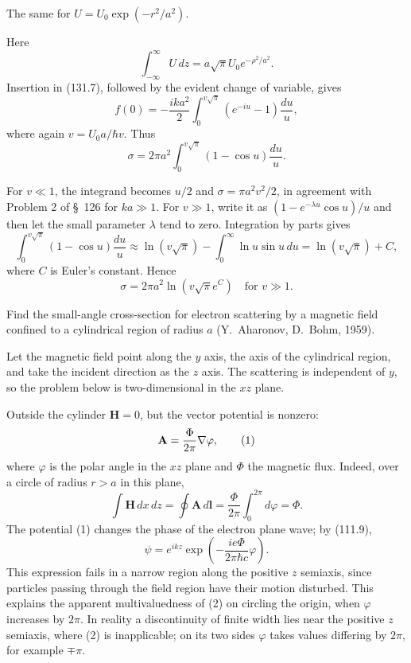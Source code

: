  The same for $U=U_0\exp(-r^2/a^2)$.

\SolutionHeading Here
\[
 \int_{-\infty}^{\infty}U\,dz=a\sqrt\pi U_0e^{-\rho^2/a^2}.
\]
Insertion in (131.7), followed by the evident change of variable, gives
\[
 f(0)=-\frac{ika^2}{2}\int_0^{v\sqrt\pi}(e^{-iu}-1)\frac{du}{u},
\]
where again $v=U_0a/\hbar v$. Thus
\[
 \sigma=2\pi a^2\int_0^{v\sqrt\pi}(1-\cos u)\frac{du}{u}.
\]

For $v\ll1$, the integrand becomes $u/2$ and
$\sigma=\pi a^2v^2/2$, in agreement with Problem 2 of \S~126 for $ka\gg1$.
For $v\gg1$, write it as $(1-e^{-\lambda u}\cos u)/u$ and then let the small
parameter $\lambda$ tend to zero. Integration by parts gives
\[
 \int_0^{v\sqrt\pi}(1-\cos u)\frac{du}{u}
 \approx\ln(v\sqrt\pi)-\int_0^\infty\ln u\sin u\,du
 =\ln(v\sqrt\pi)+C,
\]
where $C$ is Euler's constant. Hence
\[
 \sigma=2\pi a^2\ln(v\sqrt\pi e^C)\quad\text{for }v\gg1.
\]

 Find the small-angle cross-section for electron scattering
by a magnetic field confined to a cylindrical region of radius $a$
(Y.~Aharonov, D.~Bohm, 1959).

\SolutionHeading Let the magnetic field point along the $y$ axis, the axis of
the cylindrical region, and take the incident direction as the $z$ axis. The
scattering is independent of $y$, so the problem below is two-dimensional in
the $xz$ plane.

Outside the cylinder $\mathbf H=0$, but the vector potential is nonzero:
\begin{equation}
 \mathbf A=\frac{\Phi}{2\pi}\nabla \varphi,
 \tag{1}
\end{equation}
where $\varphi$ is the polar angle in the $xz$ plane and $\Phi$ the magnetic
flux. Indeed, over a circle of radius $r>a$ in this plane,
\[
 \int\mathbf H\,dx\,dz=\oint\mathbf A\,d\mathbf l
 =\frac{\Phi}{2\pi}\int_0^{2\pi}d\varphi=\Phi.
\]
The potential (1) changes the phase of the electron plane wave; by (111.9),
\begin{equation}
 \psi=e^{ikz}\exp\left(-\frac{ie\Phi}{2\pi\hbar c}\varphi\right).
 \tag{2}
\end{equation}
This expression fails in a narrow region along the positive $z$ semiaxis,
since particles passing through the field region have their motion disturbed.
This explains the apparent multivaluedness of (2) on circling the origin, when
$\varphi$ increases by $2\pi$. In reality a discontinuity of finite width lies
near the positive $z$ semiaxis, where (2) is inapplicable; on its two sides
$\varphi$ takes values differing by $2\pi$, for example $\mp\pi$.

